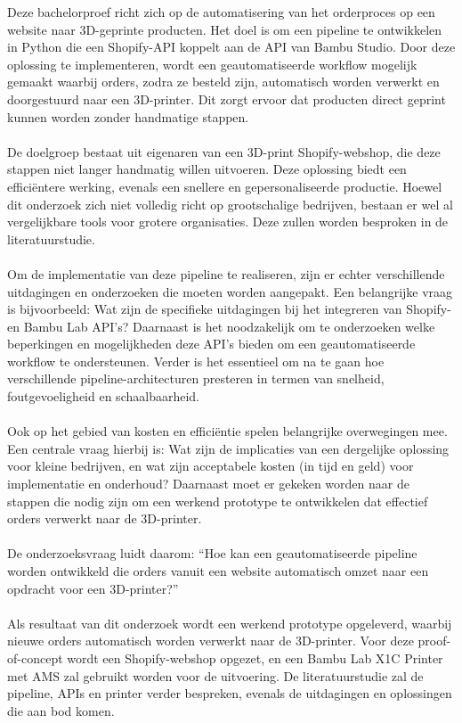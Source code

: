Deze bachelorproef richt zich op de automatisering van het orderproces op een website naar 3D-geprinte producten. Het doel is om een pipeline te ontwikkelen in Python die een Shopify-API koppelt aan de API van Bambu Studio. Door deze oplossing te implementeren, wordt een geautomatiseerde workflow mogelijk gemaakt waarbij orders, zodra ze besteld zijn, automatisch worden verwerkt en doorgestuurd naar een 3D-printer. Dit zorgt ervoor dat producten direct geprint kunnen worden zonder handmatige stappen.
\\\\
De doelgroep bestaat uit eigenaren van een 3D-print Shopify-webshop, die deze stappen niet langer handmatig willen uitvoeren. Deze oplossing biedt een efficiëntere werking, evenals een snellere en gepersonaliseerde productie. Hoewel dit onderzoek zich niet volledig richt op grootschalige bedrijven, bestaan er wel al vergelijkbare tools voor grotere organisaties. Deze zullen worden besproken in de literatuurstudie.
\\\\
Om de implementatie van deze pipeline te realiseren, zijn er echter verschillende uitdagingen en onderzoeken die moeten worden aangepakt. Een belangrijke vraag is bijvoorbeeld: Wat zijn de specifieke uitdagingen bij het integreren van Shopify- en Bambu Lab API’s? Daarnaast is het noodzakelijk om te onderzoeken welke beperkingen en mogelijkheden deze API’s bieden om een geautomatiseerde workflow te ondersteunen. Verder is het essentieel om na te gaan hoe verschillende pipeline-architecturen presteren in termen van snelheid, foutgevoeligheid en schaalbaarheid.
\\\\
Ook op het gebied van kosten en efficiëntie spelen belangrijke overwegingen mee. Een centrale vraag hierbij is: Wat zijn de implicaties van een dergelijke oplossing voor kleine bedrijven, en wat zijn acceptabele kosten (in tijd en geld) voor implementatie en onderhoud? Daarnaast moet er gekeken worden naar de stappen die nodig zijn om een werkend prototype te ontwikkelen dat effectief orders verwerkt naar de 3D-printer.
\\\\
De onderzoeksvraag luidt daarom:
“Hoe kan een geautomatiseerde pipeline worden ontwikkeld die orders vanuit een website automatisch omzet naar een opdracht voor een 3D-printer?”
\\\\
Als resultaat van dit onderzoek wordt een werkend prototype opgeleverd, waarbij nieuwe orders automatisch worden verwerkt naar de 3D-printer. Voor deze proof-of-concept wordt een Shopify-webshop opgezet, en een Bambu Lab X1C Printer met AMS zal gebruikt worden voor de uitvoering. De literatuurstudie zal de pipeline, APIs en printer verder bespreken, evenals de uitdagingen en oplossingen die aan bod komen.

